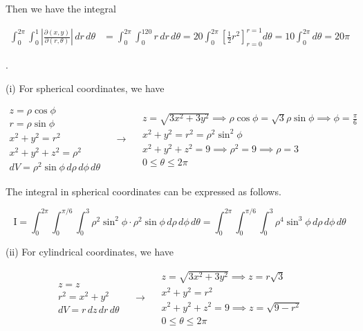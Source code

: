\documentclass{article}
\begin{document}
\hfill

\noindent Then we have the integral

\begin{align*}\int_0^{2\pi}\int_0^1\left|\frac{\partial(x,y)}{\partial(r,\theta)}\right|\,dr\,d\theta&=\int_0^{2\pi}\int_0^120r\,dr\,d\theta=20\int_0^{2\pi}\left[\frac12r^2\right]_{r=0}^{r=1}d\theta=10\int_0^{2\pi}d\theta=\boxed{20\pi}\end{align*}

.

\hfill

\noindent (i) For spherical coordinates, we have

\[
\begin{array}{c}
z=\rho\cos\phi\\
r=\rho\sin\phi\\
x^2+y^2=r^2\\
x^2+y^2+z^2=\rho^2\\
dV=\rho^2\sin\phi\,d\rho\,d\phi\,d\theta
\end{array}\quad\rightarrow\quad
\begin{array}{c}
\displaystyle z=\sqrt{3x^2+3y^2}\implies\rho\cos\phi=\sqrt3\rho\sin\phi\implies\phi=\frac\pi6\\[0.2cm]
x^2+y^2=r^2=\rho^2\sin^2\phi\\[0.1cm]
x^2+y^2+z^2=9\implies\rho^2=9\implies\rho=3\\[0.1cm]
0\leq\theta\leq2\pi
\end{array}
\]

\hfill

\noindent The integral in spherical coordinates can be expressed as follows.

\[\boxed{\mathrm{I}=\int_0^{2\pi}\int_0^{\pi/6}\int_{0}^3\rho^2\sin^2\phi\cdot\rho^2\sin\phi\,d\rho\,d\phi\,d\theta=\int_0^{2\pi}\int_0^{\pi/6}\int_{0}^3\rho^4\sin^3\phi\,d\rho\,d\phi\,d\theta}\]

\hfill

\noindent (ii) For cylindrical coordinates, we have

\[
\begin{array}{c}
z=z\\
r^2=x^2+y^2\\
dV=r\,dz\,dr\,d\theta
\end{array}\quad\rightarrow\quad
\begin{array}{c}
z=\sqrt{3x^2+3y^2}\implies z=r\sqrt3\\[0.1cm]
x^2+y^2=r^2\\[0.1cm]
x^2+y^2+z^2=9\implies z=\sqrt{9-r^2}\\[0.1cm]
0\leq\theta\leq2\pi
\end{array}
\]
\end{document}
